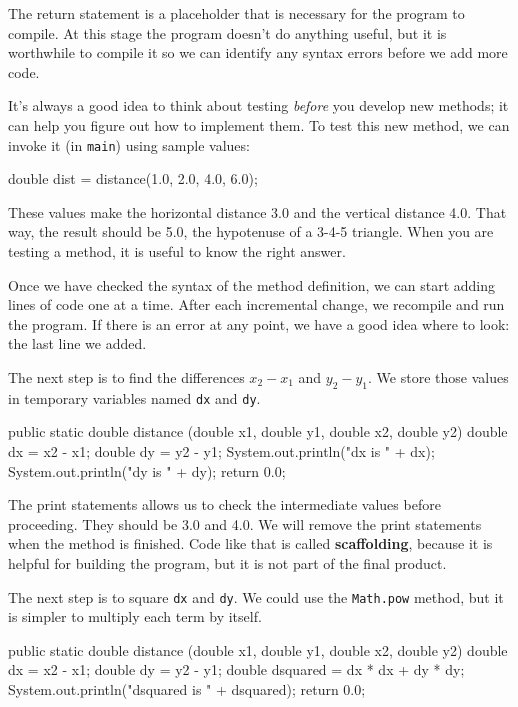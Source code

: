 \documentclass[12pt]{book}
\theoremstyle{exercise}
\newcommand{\java}[1]{\verb"#1"}
\newcommand{\java}[1]{\lstinline{#1}} %
\begin{document}
The return statement is a placeholder that is necessary for the program to compile.
At this stage the program doesn't do anything useful, but it is worthwhile to compile it so we can identify any syntax errors before we add more code.

It's always a good idea to think about testing {\it before} you develop new methods; it can help you figure out how to implement them.
To test this new method, we can invoke it (in \java{main}) using sample values:

\begin{code}
    double dist = distance(1.0, 2.0, 4.0, 6.0);
\end{code}

These values make the horizontal distance 3.0 and the vertical distance 4.0.
That way, the result should be 5.0, the hypotenuse of a 3-4-5 triangle.
When you are testing a method, it is useful to know the right answer.

Once we have checked the syntax of the method definition, we can start adding lines of code one at a time.
After each incremental change, we recompile and run the program.
If there is an error at any point, we have a good idea where to look: the last line we added.

The next step is to find the differences $x_2 - x_1$ and $y_2 - y_1$.
We store those values in temporary variables named \java{dx} and \java{dy}.

\begin{code}
    public static double distance
            (double x1, double y1, double x2, double y2) {
        double dx = x2 - x1;
        double dy = y2 - y1;
        System.out.println("dx is " + dx);
        System.out.println("dy is " + dy);
        return 0.0;
    }
\end{code}


The print statements allows us to check the intermediate values before proceeding.
They should be 3.0 and 4.0.
We will remove the print statements when the method is finished.
Code like that is called {\bf scaffolding}, because it is helpful for building the program, but it is not part of the final product.

The next step is to square \java{dx} and \java{dy}.
We could use the \java{Math.pow} method, but it is simpler to multiply each term by itself.

\begin{code}
    public static double distance
            (double x1, double y1, double x2, double y2) {
        double dx = x2 - x1;
        double dy = y2 - y1;
        double dsquared = dx * dx + dy * dy;
        System.out.println("dsquared is " + dsquared);
        return 0.0;
    }
\end{code}
\end{document}
